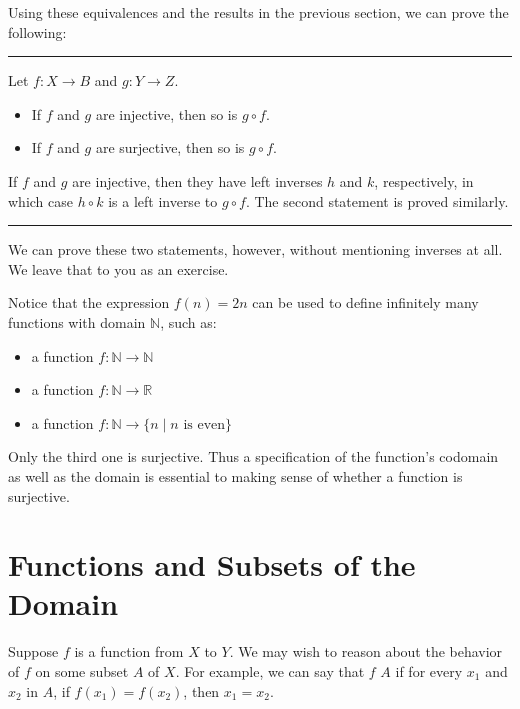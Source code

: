 \documentclass[letterpaper,10pt,english]{sphinxmanual}
\begin{document}
\sphinxAtStartPar
Using these equivalences and the results in the previous section, we can prove the following:


\bigskip\hrule\bigskip


\sphinxAtStartPar
{} Let \(f : X \to B\) and \(g : Y \to Z\).
\begin{itemize}
\item {} 
\sphinxAtStartPar
If \(f\) and \(g\) are injective, then so is \(g \circ f\).

\item {} 
\sphinxAtStartPar
If \(f\) and \(g\) are surjective, then so is \(g \circ f\).

\end{itemize}

\sphinxAtStartPar
{} If \(f\) and \(g\) are injective, then they have left inverses \(h\) and \(k\), respectively, in which case \(h \circ k\) is a left inverse to \(g \circ f\). The second statement is proved similarly.


\bigskip\hrule\bigskip


\sphinxAtStartPar
We can prove these two statements, however, without mentioning inverses at all. We leave that to you as an exercise.

\sphinxAtStartPar
Notice that the expression \(f(n) = 2 n\) can be used to define infinitely many functions with domain \(\mathbb{N}\), such as:
\begin{itemize}
\item {} 
\sphinxAtStartPar
a function \(f : \mathbb{N} \to \mathbb{N}\)

\item {} 
\sphinxAtStartPar
a function \(f : \mathbb{N} \to \mathbb{R}\)

\item {} 
\sphinxAtStartPar
a function \(f: \mathbb{N} \to \{ n \mid n \text{ is even} \}\)

\end{itemize}

\sphinxAtStartPar
Only the third one is surjective. Thus a specification of the function’s codomain as well as the domain is essential to making sense of whether a function is surjective.


\section{Functions and Subsets of the Domain}
\label{\detokenize{functions:functions-and-subsets-of-the-domain}}
\sphinxAtStartPar
Suppose \(f\) is a function from \(X\) to \(Y\). We may wish to reason about the behavior of \(f\) on some subset \(A\) of \(X\). For example, we can say that \(f\)  \(A\) if for every \(x_1\) and \(x_2\) in \(A\), if \(f(x_1) = f(x_2)\), then \(x_1 = x_2\).
\end{document}
